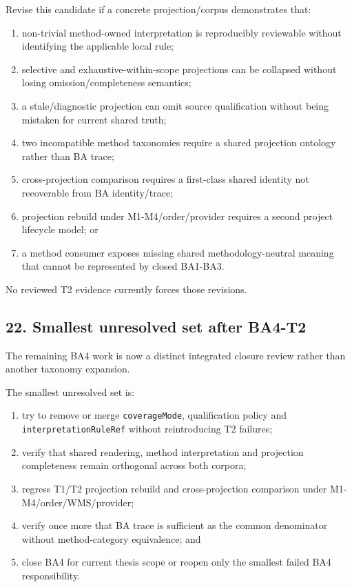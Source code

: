 \documentclass[11pt,a4paper]{article}
\providecommand{\tightlist}{\setlength{\itemsep}{0pt}\setlength{\parskip}{0pt}}
\begin{document}
Revise this candidate if a concrete projection/corpus demonstrates that:

\begin{enumerate}
\def\labelenumi{\arabic{enumi}.}
\tightlist
\item
  non-trivial method-owned interpretation is reproducibly reviewable
  without identifying the applicable local rule;
\item
  selective and exhaustive-within-scope projections can be collapsed
  without losing omission/completeness semantics;
\item
  a stale/diagnostic projection can omit source qualification without
  being mistaken for current shared truth;
\item
  two incompatible method taxonomies require a shared projection
  ontology rather than BA trace;
\item
  cross-projection comparison requires a first-class shared identity not
  recoverable from BA identity/trace;
\item
  projection rebuild under M1-M4/order/provider requires a second
  project lifecycle model; or
\item
  a method consumer exposes missing shared methodology-neutral meaning
  that cannot be represented by closed BA1-BA3.
\end{enumerate}

No reviewed T2 evidence currently forces those revisions.

\subsection{22. Smallest unresolved set after
BA4-T2}\label{22-smallest-unresolved-set-after-ba4-t2}

The remaining BA4 work is now a distinct integrated closure review
rather than another taxonomy expansion.

The smallest unresolved set is:

\begin{enumerate}
\def\labelenumi{\arabic{enumi}.}
\tightlist
\item
  try to remove or merge \texttt{coverageMode}, qualification policy and
  \texttt{interpretationRuleRef} without reintroducing T2 failures;
\item
  verify that shared rendering, method interpretation and projection
  completeness remain orthogonal across both corpora;
\item
  regress T1/T2 projection rebuild and cross-projection comparison under
  M1-M4/order/WMS/provider;
\item
  verify once more that BA trace is sufficient as the common denominator
  without method-category equivalence; and
\item
  close BA4 for current thesis scope or reopen only the smallest failed
  BA4 responsibility.
\end{enumerate}
\end{document}
